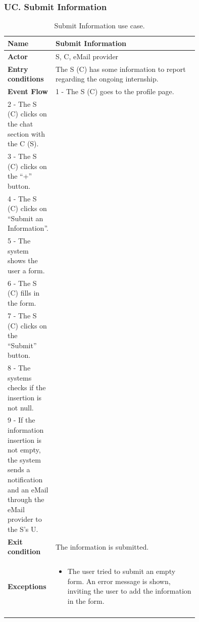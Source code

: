 \subsubsection*{UC\cuc . Submit Information}
\begin{center}
    \begin{longtable}{|l|p{0.75\linewidth}|}
        \hline
        \textbf{Name}               & Submit Information\\
        \hline
        \textbf{Actor}              & S, C, eMail provider\\
        \hline
        \textbf{Entry conditions}   & The S (C) has some information to report regarding the ongoing internship.\\
        \hline
        \textbf{Event Flow}         & 
        1 - The S (C) goes to the profile page. \\
        2 - The S (C) clicks on the chat section with the C (S). \\
        3 - The S (C) clicks on the “+” button. \\
        4 - The S (C) clicks on “Submit an Information”. \\
        5 - The system shows the user a form. \\
        6 - The S (C) fills in the form. \\
        7 - The S (C) clicks on the “Submit” button. \\
        8 - The systems checks if the insertion is not null. \\
        9 - If the information insertion is not empty, the system sends a notification and an eMail through the eMail provider to the S’s U. \\
        \hline
        \textbf{Exit condition}   & The information is submitted. \\       
        \hline
        \textbf{Exceptions}       & \begin{itemize}
            \item The user tried to submit an empty form. An error message is shown, inviting the user to add the information in the form.
        \end{itemize}\\
        \hline
        \caption{Submit Information use case.}
        \label{tab: submit_information_use_case}
    \end{longtable}
\end{center}


